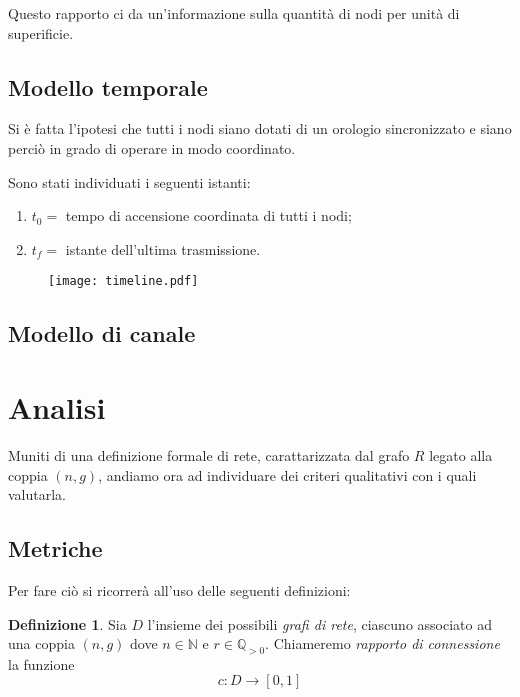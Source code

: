 \documentclass[a4paper,12pt]{article}
\theoremstyle{definition}
\newtheorem{definition}{Definizione}
\begin{document}
Questo rapporto ci da un'informazione sulla quantità di nodi per unità di superificie.

\subsection{Modello temporale}

Si è fatta l'ipotesi che tutti i nodi siano dotati di un orologio sincronizzato e siano perciò in grado di operare in modo coordinato.

Sono stati individuati i seguenti istanti:

\begin{enumerate}
\item $t_0 =$ tempo di accensione coordinata di tutti i nodi;
\item $t_f =$ istante dell'ultima trasmissione.
\end{enumerate}

\begin{figure}[H]
\centering
\texttt{[image: timeline.pdf]}
\caption{}
\end{figure}

\subsection{Modello di canale}


\section{Analisi}

Muniti di una definizione formale di rete, carattarizzata dal grafo $R$ legato alla coppia $(n, g)$, andiamo ora ad individuare dei criteri qualitativi con i quali valutarla.

\subsection{Metriche}

Per fare ciò si ricorrerà all'uso delle seguenti definizioni:

\begin{definition}
Sia $D$ l'insieme dei possibili \emph{grafi di rete}, ciascuno associato ad una coppia $(n, g)$ dove $n \in \mathbb{N}$ e $r \in \mathbb{Q}_{>0}$. Chiameremo \emph{rapporto di connessione} la funzione
\begin{displaymath}
c \colon D \to [0, 1]
\end{displaymath}
\end{definition}
\end{document}

